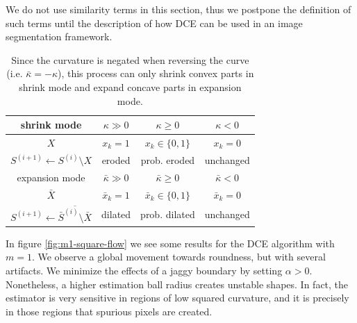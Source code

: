 \documentclass[runningheads]{llncs}
\begin{document}
We do not use similarity terms in this section, thus we postpone the
definition of such terms until the description of how DCE can be used
in an image segmentation framework.



\begin{table}
  \center
  \begin{tabular}{|c|c|c|c|} \hline
    shrink mode &    $\kappa \gg 0$ & $\kappa \geq 0$ &  $\kappa < 0$ \\ \hline
    $X$ & $x_k=1$ & $x_k \in \{0,1\}$ & $x_k=0$ \\ \hline
    $S^{(i+1)} \leftarrow S^{(i)} \setminus X$ & eroded & prob. eroded & unchanged  \\ \hline \hline
    expansion mode &    $\bar{\kappa} \gg 0$ & $\bar{\kappa} \geq 0$ & $\bar{\kappa} < 0$ \\ \hline
    $\bar{X}$ & $\bar{x}_k=1$ & $\bar{x}_k \in \{0,1\}$ & $\bar{x}_k=0$ \\ \hline
    $S^{(i+1)} \leftarrow \overline{\bar{S}^{(i)} \setminus \bar{X}}$ & dilated & prob. dilated & unchanged \\ \hline 
  \end{tabular}
  
  \label{tab:flow-summary}	  
  \caption{  Since the curvature is negated when reversing the curve (i.e. $\bar{\kappa}=-\kappa$), this process can only shrink  convex parts in shrink mode and expand concave parts in expansion mode.}

\end{table}


In figure \ref{fig:m1-square-flow} we see some results for the DCE
algorithm with $m=1$. We observe a global movement towards roundness,
but with several artifacts. We minimize the effects of a jaggy
boundary by setting $\alpha > 0$. Nonetheless, a higher estimation
ball radius creates unstable shapes. In fact, the estimator is very
sensitive in regions of low squared curvature, and it is precisely in
those regions that spurious pixels are created. 
\end{document}
